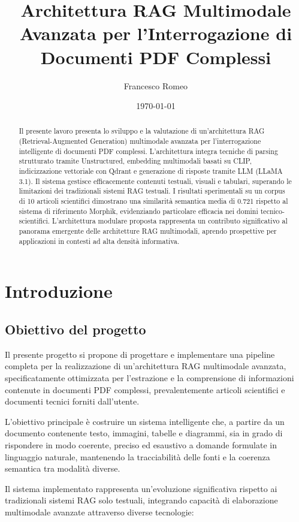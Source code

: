 \documentclass[12pt,a4paper]{article}
\title{Architettura RAG Multimodale Avanzata per l'Interrogazione di Documenti PDF Complessi}
\author{Francesco Romeo}
\date{\today}
\begin{document}
\maketitle

\begin{abstract}
Il presente lavoro presenta lo sviluppo e la valutazione di un'architettura RAG (Retrieval-Augmented Generation) multimodale avanzata per l'interrogazione intelligente di documenti PDF complessi. L'architettura integra tecniche di parsing strutturato tramite Unstructured, embedding multimodali basati su CLIP, indicizzazione vettoriale con Qdrant e generazione di risposte tramite LLM (LLaMA 3.1). Il sistema gestisce efficacemente contenuti testuali, visuali e tabulari, superando le limitazioni dei tradizionali sistemi RAG testuali. I risultati sperimentali su un corpus di 10 articoli scientifici dimostrano una similarità semantica media di 0.721 rispetto al sistema di riferimento Morphik, evidenziando particolare efficacia nei domini tecnico-scientifici. L'architettura modulare proposta rappresenta un contributo significativo al panorama emergente delle architetture RAG multimodali, aprendo prospettive per applicazioni in contesti ad alta densità informativa.
\end{abstract}

\tableofcontents
\newpage

\section{Introduzione}

\subsection{Obiettivo del progetto}
Il presente progetto si propone di progettare e implementare una pipeline completa per la realizzazione di un'architettura RAG multimodale avanzata, specificatamente ottimizzata per l'estrazione e la comprensione di informazioni contenute in documenti PDF complessi, prevalentemente articoli scientifici e documenti tecnici forniti dall'utente. 

L'obiettivo principale è costruire un sistema intelligente che, a partire da un documento contenente testo, immagini, tabelle e diagrammi, sia in grado di rispondere in modo coerente, preciso ed esaustivo a domande formulate in linguaggio naturale, mantenendo la tracciabilità delle fonti e la coerenza semantica tra modalità diverse. 

Il sistema implementato rappresenta un'evoluzione significativa rispetto ai tradizionali sistemi RAG solo testuali, integrando capacità di elaborazione multimodale avanzate attraverso diverse tecnologie:
\end{document}
